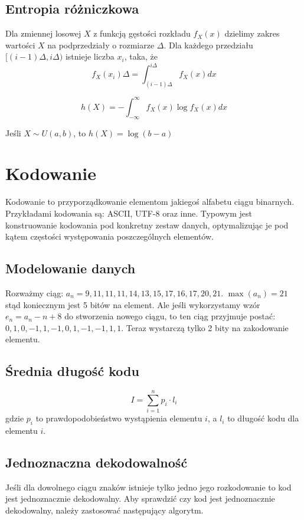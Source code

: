 \documentclass{../notatki}
\begin{document}
\subsection{Entropia różniczkowa}

Dla zmiennej losowej $X$ z funkcją gęstości rozkładu $f_X(x)$ dzielimy
zakres wartości $X$ na podprzedziały o rozmiarze $\Delta$. Dla każdego
przedziału $[(i - 1) \Delta, i \Delta)$ istnieje liczba $x_i$, taka, że
$$
f_X(x_i)\Delta = \int_{(i - 1)\Delta}^{i\Delta} f_X(x) dx
$$

$$
h(X) = - \int_{-\infty}^{\infty} f_X(x) \log f_X(x) dx
$$

Jeśli $X \sim U(a, b)$, to $h(X) = \log(b - a)$

\section{Kodowanie}

Kodowanie to przyporządkowanie elementom jakiegoś alfabetu ciągu binarnych.
Przykładami kodowania są: ASCII, UTF-8 oraz inne. Typowym jest konstruowanie
kodowania pod konkretny zestaw danych, optymalizując je pod kątem częstości
występowania poszczególnych elementów.

\subsection{Modelowanie danych}

Rozważmy ciąg: $a_n=9,11,11,11,14,13,15,17,16,17,20,21$. $\max(a_n)=21$ stąd
koniecznym jest 5 bitów na element. Ale jeśli wykorzystamy wzór
$e_n=a_n - n + 8$ do stworzenia nowego ciągu, to ten ciąg przyjmuje postać:
$0,1,0,-1,1,-1,0,1,-1,-1,1,1$. Teraz wystarczą tylko 2 bity na zakodowanie
elementu.

\subsection{Średnia długość kodu}

$$
I = \sum_{i=1}^{n}p_i \cdot l_i
$$
gdzie $p_i$ to prawdopodobieństwo wystąpienia elementu $i$, a $l_i$ to długość
kodu dla elementu $i$.

\subsection{Jednoznaczna dekodowalność}

Jeśli dla dowolnego ciągu znaków istnieje tylko jedno jego rozkodowanie to
kod jest jednoznacznie dekodowalny. Aby sprawdzić czy kod jest jednoznacznie
dekodowalny, należy zastosować następujący algorytm.
\end{document}
